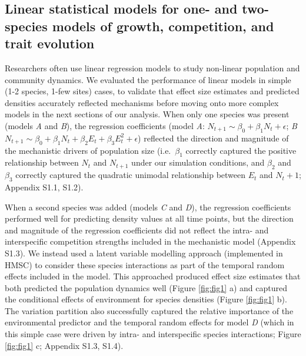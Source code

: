 \documentclass[
]{article}
\begin{document}
\hypertarget{linear-statistical-models-for-one--and-two-species-models-of-growth-competition-and-trait-evolution-1}{%
\subsection{Linear statistical models for one- and two-species models of growth, competition, and trait evolution}\label{linear-statistical-models-for-one--and-two-species-models-of-growth-competition-and-trait-evolution-1}}

Researchers often use linear regression models to study non-linear population and community dynamics. We evaluated the performance of linear models in simple (1-2 species, 1-few sites) cases, to validate that effect size estimates and predicted densities accurately reflected mechanisms before moving onto more complex models in the next sections of our analysis. When only one species was present (models \emph{A} and \emph{B}), the regression coefficients (model \emph{A}: \(N_{t+1} \sim \beta_0 + \beta_1 N_t + \epsilon\); \emph{B} \(N_{t+1} \sim \beta_0 + \beta_1 N_t + \beta_2 E_t + \beta_3 E_t^2 + \epsilon\)) reflected the direction and magnitude of the mechanistic drivers of population size (i.e.~\(\beta_1\) correctly captured the positive relationship between \(N_t\) and \(N_{t+1}\) under our simulation conditions, and \(\beta_2\) and \(\beta_3\) correctly captured the quadratic unimodal relationship between \(E_t\) and \(N_t+1\); Appendix S1.1, S1.2).

When a second species was added (models \emph{C} and \emph{D}), the regression coefficients performed well for predicting density values at all time points, but the direction and magnitude of the regression coefficients did not reflect the intra- and interspecific competition strengths included in the mechanistic model (Appendix S1.3). We instead used a latent variable modelling approach (implemented in HMSC) to consider these species interactions as part of the temporal random effects included in the model. This approached produced effect size estimates that both predicted the population dynamics well (Figure \ref{fig:fig1} a) and captured the conditional effects of environment for species densities (Figure \ref{fig:fig1} b). The variation partition also successfully captured the relative importance of the environmental predictor and the temporal random effects for model \emph{D} (which in this simple case were driven by intra- and interspecific species interactions; Figure \ref{fig:fig1} c; Appendix S1.3, S1.4).
\end{document}
